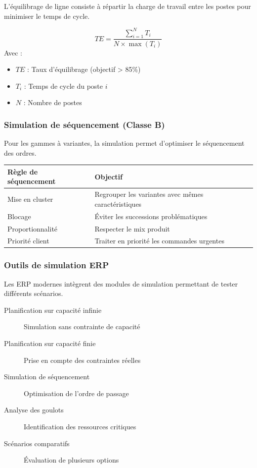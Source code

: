 \documentclass{article}
\begin{document}
\begin{table}[h]
L'équilibrage de ligne consiste à répartir la charge de travail entre les postes pour minimiser le temps de cycle.

\begin{tcolorbox}[colback=blueclair, colframe=blue!70!black, title=Calcul du taux d'équilibrage]
\[
TE = \frac{\sum_{i=1}^{N} T_i}{N \times \max(T_i)}
\]
Avec :
\begin{itemize}
    \item $TE$ : Taux d'équilibrage (objectif > 85\%)
    \item $T_i$ : Temps de cycle du poste $i$
    \item $N$ : Nombre de postes
\end{itemize}
\end{tcolorbox}

\subsubsection{Simulation de séquencement (Classe B)}

Pour les gammes à variantes, la simulation permet d'optimiser le séquencement des ordres.

\begin{table}[h]
\centering
\begin{tabular}{|p{}|p{}|}
\hline
\textbf{Règle de séquencement} & \textbf{Objectif} \\
\hline
Mise en cluster & Regrouper les variantes avec mêmes caractéristiques \\
Blocage & Éviter les successions problématiques \\
Proportionnalité & Respecter le mix produit \\
Priorité client & Traiter en priorité les commandes urgentes \\
\hline
\end{tabular}
\end{table}

\subsubsection{Outils de simulation ERP}

Les ERP modernes intègrent des modules de simulation permettant de tester différents scénarios.

\begin{tcolorbox}[colback=orangeclair, colframe=orange!70!black, title=Fonctionnalités de simulation ERP]
\begin{description}
    \item[Planification sur capacité infinie] Simulation sans contrainte de capacité
    \item[Planification sur capacité finie] Prise en compte des contraintes réelles
    \item[Simulation de séquencement] Optimisation de l'ordre de passage
    \item[Analyse des goulots] Identification des ressources critiques
    \item[Scénarios comparatifs] Évaluation de plusieurs options
\end{description}
\end{tcolorbox}


\end{table}
\end{document}
